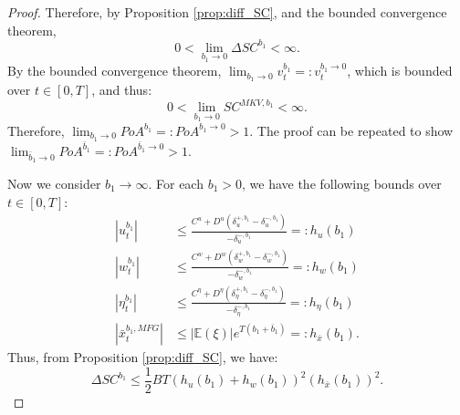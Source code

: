 \documentclass[11pt]{article}
\begin{document}
\begin{proof}
	Therefore, by Proposition \ref{prop:diff_SC}, and the bounded convergence theorem,
    \begin{equation*}
        0<\lim_{b_1 \to 0} \Delta SC^{b_1}<\infty.
    \end{equation*}
    By the bounded convergence theorem, $\lim_{b_1 \to 0}v^{b_1}_t=:v_t^{b_1 \to 0}$, which is bounded over $t\in [0,T]$, and thus:
    $$0<\lim_{b_1 \to 0} SC^{MKV,b_1}<\infty.$$
    Therefore, $\lim_{b_1 \to 0} PoA^{b_1} =: PoA^{b_1 \to 0} > 1$. The proof can be repeated to show $\lim_{\bar{b}_1 \to 0} PoA^{\bar{b}_1} =: PoA^{\bar{b}_1 \to 0} > 1$.
    
    Now we consider $b_1 \to \infty$. For each $b_1>0$, we have the following bounds over $t\in[0,T]$:
    \begin{equation*}
    \begin{split}
	    \left| u^{b_1}_t\right| &\leq \frac{C^u+D^u(\delta^{+,b_1}_u-\delta^{-,b_1}_u)}{-\delta^{-,b_1}_u}=:h_u(b_1) \\
		\left| w^{b_1}_t\right| &\leq \frac{C^w+D^w(\delta^{+,b_1}_w-\delta^{-,b_1}_w)}{-\delta^{-,b_1}_w}=:h_w(b_1) \\
		\left| \eta^{b_1}_t\right| &\leq \frac{C^{\eta}+D^{\eta}(\delta^{+,b_1}_{\eta}-\delta^{-,b_1}_{\eta})}{-\delta^{-,b_1}_{\eta}}=:h_{\eta}(b_1) \\
		\left| \bar{x}^{b_1,MFG}_t \right| &\leq \left| \mathbb{E}(\xi)\right| e^{T(b_1+\bar{b}_1)}=:h_{\bar{x}}(b_1).
    \end{split}
    \end{equation*}
    Thus, from Proposition \ref{prop:diff_SC}, we have:
    \begin{equation*}
	    \Delta SC^{b_1} \leq \frac{1}{2}BT(h_u(b_1)+h_w(b_1))^2 (h_{\bar{x}}(b_1))^2.
    \end{equation*}
    

\end{proof}
\end{document}

